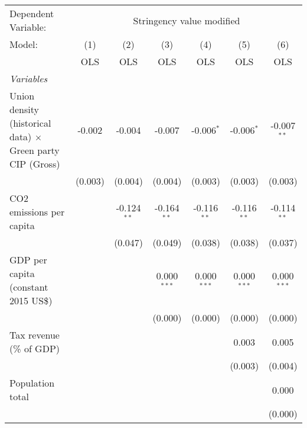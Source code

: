 
\begingroup
\centering
\begin{tabular}{lcccccc}
   \toprule
   Dependent Variable: & \multicolumn{6}{c}{Stringency value modified}\\
   Model:                                                            & (1)     & (2)           & (3)           & (4)           & (5)           & (6)\\  
                                                                     &  OLS    & OLS           & OLS           & OLS           & OLS           & OLS\\  
   \midrule
   \emph{Variables}\\
   Union density (historical data) $\times$ Green party CIP (Gross)  & -0.002  & -0.004        & -0.007        & -0.006$^{*}$  & -0.006$^{*}$  & -0.007$^{**}$\\   
                                                                     & (0.003) & (0.004)       & (0.004)       & (0.003)       & (0.003)       & (0.003)\\   
   CO2 emissions per capita                                          &         & -0.124$^{**}$ & -0.164$^{**}$ & -0.116$^{**}$ & -0.116$^{**}$ & -0.114$^{**}$\\   
                                                                     &         & (0.047)       & (0.049)       & (0.038)       & (0.038)       & (0.037)\\   
   GDP per capita (constant 2015 US\$)                               &         &               & 0.000$^{***}$ & 0.000$^{***}$ & 0.000$^{***}$ & 0.000$^{***}$\\   
                                                                     &         &               & (0.000)       & (0.000)       & (0.000)       & (0.000)\\   
   Tax revenue (\% of GDP)                                           &         &               &               &               & 0.003         & 0.005\\   
                                                                     &         &               &               &               & (0.003)       & (0.004)\\   
   Population total                                                  &         &               &               &               &               & 0.000\\   
                                                                     &         &               &               &               &               & (0.000)\\   

\end{tabular}
